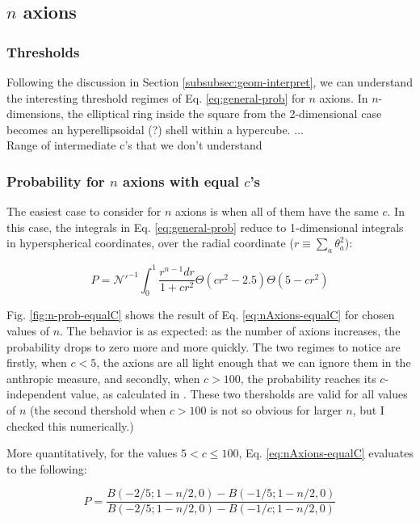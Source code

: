 \documentclass{article}
\begin{document}
\subsection{$n$ axions}
\subsubsection{Thresholds}
Following the discussion in Section \ref{subsubsec:geom-interpret}, we can understand the interesting threshold regimes of Eq. \eqref{eq:general-prob} for $n$ axions. In $n$-dimensions, the elliptical ring inside the square from the 2-dimensional case becomes an hyperellipsoidal (?) shell within a hypercube. ... \\
Range of intermediate c's that we don't understand

\subsubsection{Probability for $n$ axions with equal $c$'s}
The easiest case to consider for $n$ axions is when all of them have the same $c$. In this case, the integrals in Eq. \eqref{eq:general-prob} reduce to 1-dimensional integrals in hyperspherical coordinates, over the radial coordinate ($r\equiv\sum_a\theta_a^2$):

\begin{equation}
    \label{eq:nAxions-equalC}
         P = \mathcal{N'}^{-1} \int_{0}^1 \frac{r^{n-1} dr}{1+c r^2}\Theta(c r^2-2.5)\Theta(5-c r^2)
\end{equation}

Fig. \ref{fig:n-prob-equalC} shows the result of Eq. \eqref{eq:nAxions-equalC} for chosen values of $n$. The behavior is as expected: as the number of axions increases, the probability drops to zero more and more quickly. The two regimes to notice are firstly, when $c<5$, the axions are all light enough that we can ignore them in the anthropic measure, and secondly, when $c>100$, the probability reaches its $c$-independent value, as calculated in \cite{exploring-string-axiverse}. These two thersholds are valid for all values of $n$ (the second thershold when $c>100$ is not so obvious for larger $n$, but I checked this numerically.)

More quantitatively, for the values $5<c\leq 100$, Eq. \eqref{eq:nAxions-equalC} evaluates to the following:

\begin{equation}
    P = \frac{B(-2/5;1-n/2,0)-B(-1/5;1-n/2,0)}{B(-2/5;1-n/2,0)-B(-1/c;1-n/2,0)}
\end{equation}
\end{document}
